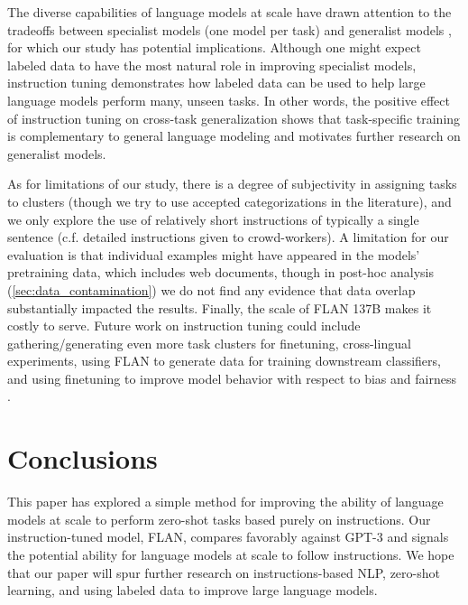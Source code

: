 \documentclass{article} %
\newcommand{\flan}{FLAN}
\begin{document}
The diverse capabilities of language models at scale have drawn attention to the tradeoffs between specialist models (one model per task) and generalist models \citep[one model for many tasks;][]{arivazhagan2019massively,pratap2020massively}, for which our study has potential implications. 
Although one might expect labeled data to have the most natural role in improving specialist models, instruction tuning demonstrates how labeled data can be used to help large language models perform many, unseen tasks. 
In other words, the positive effect of instruction tuning on cross-task generalization shows that task-specific training is complementary to general language modeling and motivates further research on generalist models. 

As for limitations of our study, there is a degree of subjectivity in assigning tasks to clusters (though we try to use accepted categorizations in the literature), and we only explore the use of relatively short instructions of typically a single sentence (c.f. detailed instructions given to crowd-workers). 
A limitation for our evaluation is that individual examples might have appeared in the models’ pretraining data, which includes web documents, though in post-hoc analysis (\cref{sec:data_contamination}) we do not find any evidence that data overlap substantially impacted the results.
Finally, the scale of \flan{} 137B makes it costly to serve.
Future work on instruction tuning could include gathering/generating even more task clusters for finetuning, 
cross-lingual experiments, 
using \flan{} to generate data for training downstream classifiers, 
and using finetuning to improve model behavior with respect to bias and fairness \citep{solaiman2021process}. 

\section{Conclusions}
This paper has explored a simple method for improving the ability of language models at scale to perform zero-shot tasks based purely on instructions.
Our instruction-tuned model, \flan{}, compares favorably against GPT-3 and signals the potential ability for language models at scale to follow instructions.
We hope that our paper will spur further research on instructions-based NLP, zero-shot learning, and using labeled data to improve large language models. 
\end{document}
